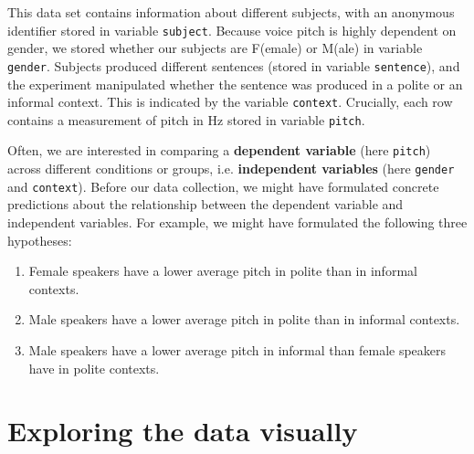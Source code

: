 \documentclass[nobib]{tufte-handout}
\begin{document}
\medskip

\noindent This data set contains information about different subjects, with an anonymous identifier stored in variable \texttt{subject}.
Because voice pitch is highly dependent on gender, we stored whether our subjects are F(emale) or M(ale) in variable \texttt{gender}.
Subjects produced different sentences (stored in variable \texttt{sentence}), and the experiment manipulated whether the sentence was produced in a polite or an informal context.
This is indicated by the variable \texttt{context}. Crucially, each row contains a measurement of pitch in Hz stored in variable \texttt{pitch}.

Often, we are interested in comparing a \textbf{dependent variable} (here \texttt{pitch})
across different conditions or groups, i.e. \textbf{independent variables} (here \texttt{gender} and \texttt{context}). Before our data collection,
we might have formulated concrete predictions about the relationship between the dependent
variable and independent variables. For example, we might have formulated the following three
hypotheses:

\begin{enumerate}[{H}1:]
\item Female speakers have a lower average pitch in polite than in informal contexts.
\item Male speakers have a lower average pitch in polite than in informal contexts.
\item Male speakers have a lower average pitch in informal than female speakers have in polite contexts.
\end{enumerate}

\section{Exploring the data visually}
\end{document}
